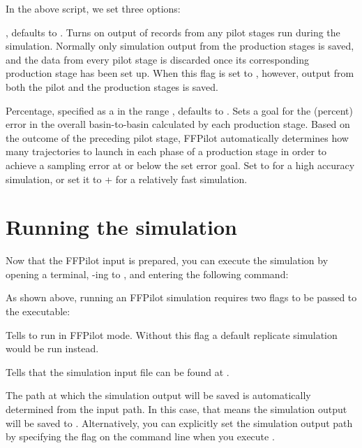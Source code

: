 {In the above script, we set three options:
\begin{description}[style=nextline]
    \item[\code{ffluxPilotOutput}] , defaults to . Turns on output of records from any pilot stages run during the simulation. Normally only simulation output from the production stages is saved, and the data from every pilot stage is discarded once its corresponding production stage has been set up. When this flag is set to , however, output from both the pilot and the production stages is saved.
    \item[\code{errorGoal}] Percentage, specified as a  in the range \code{(0-1.0]}, defaults to . Sets a goal for the (percent) error in the overall basin-to-basin  calculated by each production stage. Based on the outcome of the preceding pilot stage, FFPilot automatically determines how many trajectories to launch in each phase of a production stage in order to achieve a sampling error at or below the set error goal. Set  to  for a high accuracy simulation, or set it to + for a relatively fast simulation.
\end{description}

\section{Running the simulation}\label{sec:running_srg_mfpt}
Now that the FFPilot input is prepared, you can execute the simulation by opening a terminal, -ing to \pth{\dir}, and entering the following command:


As shown above, running an FFPilot simulation requires two flags to be passed to the  executable:
\begin{description}[style=nextline]
    \item[\code{-ffpilot}] Tells  to run in FFPilot mode. Without this flag a default replicate simulation would be run instead.
    \item[\code{-f <input-path>}] Tells  that the simulation input file can be found at .
\end{description}

The path at which the simulation output will be saved is automatically determined from the input path. In this case, that means the simulation output will be saved to \pth{\outpathrel}. Alternatively, you can explicitly set the simulation output path by specifying the  flag on the command line when you execute .

}
